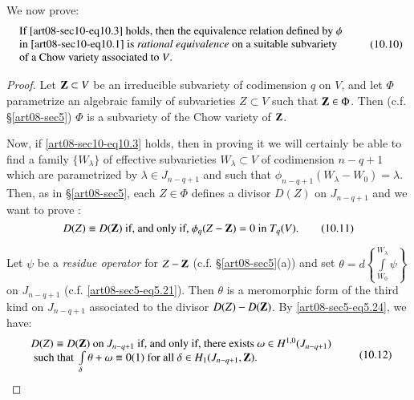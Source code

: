 We now prove:
\begin{equation*}
\begin{array}{l}
\text{If \eqref{art08-sec10-eq10.3} holds, then the equivalence relation defined by $\phi$}\\
\text{in \eqref{art08-sec10-eq10.1} is {\em rational equivalence} on a suitable subvariety}\\
\text{of a Chow variety associated to $V$.}
\end{array}\tag{10.10}\label{art08-sec10-eq10.10}
\end{equation*}

\begin{proof}
Let $\mathbf{Z}\subset V$ be an irreducible subvariety of codimension $q$ on $V$, and let $\Phi$ parametrize an algebraic family of subvarieties $Z\subset V$ such that $\mathbf{Z}\in\Phi$. Then (c.f. \S\ref{art08-sec5}) $\Phi$ is a subvariety of the Chow variety of $\mathbf{Z}$.

Now, if \eqref{art08-sec10-eq10.3} holds, then in proving it we will certainly be able to find a family $\{W_{\lambda}\}$ of effective subvarieties $W_{\lambda}\subset V$ of codimension $n-q+1$ which are parametrized by $\lambda\in J_{n-q+1}$ and such that $\phi_{n-q+1}(W_{\lambda}-W_{0})=\lambda$. Then, as in \S\ref{art08-sec5}, each $Z\in \Phi$ defines a divisor $D(Z)$ on $J_{n-q+1}$ and we want to prove :
\begin{equation*}
D(Z)\equiv D(\mathbf{Z})\text{ if, and only if, } \phi_{q}(Z-\mathbf{Z})=0\text{ in } T_{q}(V).\tag{10.11}\label{art08-sec10-eq10.11}
\end{equation*}

Let $\psi$ be a {\em residue operator} for $Z-\mathbf{Z}$ (c.f. \S\ref{art08-sec5}(a)) and set $\theta=d\left\{\int\limits^{W_{\lambda}}_{W_{0}}\psi\right\}$ on $J_{n-q+1}$ (c.f. \eqref{art08-sec5-eq5.21}). Then $\theta$ is a meromorphic form of the third kind on $J_{n-q+1}$ associated to the divisor $D(Z)-D(\mathbf{Z})$. By \eqref{art08-sec5-eq5.24}, we have:
\begin{equation*}
\begin{array}{l}
D(Z)\equiv D(\mathbf{Z})\text{ on } J_{n-q+1} \text{ if, and only if, there exists } \omega\in H^{1,0}(J_{n-q+1})\\
\text{ such that } \int\limits_{\delta}\theta+\omega\equiv 0(1)\text{ for all }\delta\in H_{1}(J_{n-q+1},\mathbf{Z}).
\end{array}\tag{10.12}\label{art08-sec10-eq10.12}
\end{equation*}\pageoriginale


\end{proof}
